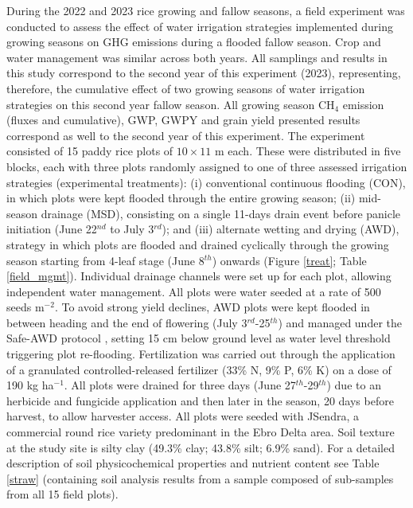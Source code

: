During the 2022 and 2023 rice growing and fallow seasons, a field experiment was conducted to assess the effect of water irrigation strategies implemented during growing seasons on GHG emissions during a flooded fallow season. Crop and water management was similar across both years. All samplings and results in this study correspond to the second year of this experiment (2023), representing, therefore, the cumulative effect of two growing seasons of water irrigation strategies on this second year fallow season. All growing season CH$_{4}$ emission (fluxes and cumulative), GWP, GWPY and grain yield presented results correspond as well to the second year of this experiment. The experiment consisted of 15 paddy rice plots of $10 \times 11$ m each. These were distributed in five blocks, each with three plots randomly assigned to one of three assessed irrigation strategies (experimental treatments): (i) conventional continuous flooding (CON), in which plots were kept flooded through the entire growing season; (ii) mid-season drainage (MSD), consisting on a single 11-days drain event before panicle initiation (June 22$^{nd}$ to July 3$^{rd}$); and (iii) alternate wetting and drying (AWD), strategy in which plots are flooded and drained cyclically through the growing season starting from 4-leaf stage (June 8$^{th}$) onwards (Figure \ref{treat}; Table \ref{field_mgmt}). Individual drainage channels were set up for each plot, allowing independent water management. All plots were water seeded at a rate of 500 seeds m$^{-2}$. To avoid strong yield declines, AWD plots were kept flooded in between heading and the end of flowering (July 3$^{rd}$-25$^{th}$) and managed under the Safe-AWD protocol \citep{bouman2007a}, setting 15 cm below ground level as water level threshold triggering plot re-flooding. Fertilization was carried out through the application of a granulated controlled-released fertilizer (33\% N, 9\% P, 6\% K) on a dose of 190 kg ha$^{-1}$. All plots were drained for three days (June 27$^{th}$-29$^{th}$) due to an herbicide and fungicide application and then later in the season, 20 days before harvest, to allow harvester access. All plots were seeded with JSendra, a commercial round rice variety predominant in the Ebro Delta area. Soil texture at the study site is silty clay (49.3\% clay; 43.8\% silt; 6.9\% sand). For a detailed description of soil physicochemical properties and nutrient content see Table \ref{straw} (containing soil analysis results from a sample composed of sub-samples from all 15 field plots).\\ 

